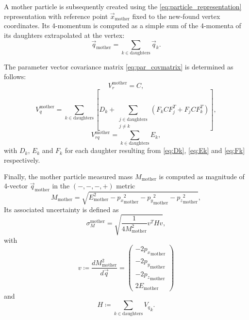 A mother particle is subsequently created using the \eqref{eq:particle_representation} representation with reference point $\vec{x}_\text{mother}$ fixed to the new-found vertex coordinates.
Its 4-momentum is computed as a simple sum of the 4-momenta of its daughters extrapolated at the vertex:
\begin{equation}
	\vec{q}_\text{mother} = \sum_{k \in \text{daughters}} \vec{q}_k.
\end{equation}

The parameter vector covariance matrix \eqref{eq:par_covmatrix} is determined as follows:
\begin{equation}
	V_{r}^\text{mother} = C,
\end{equation}
\begin{equation}
	V_{q}^\text{mother} = \sum_{k \in \text{daughters}} \left[
		D_k
		+
		\sum_{\substack{j\in\text{daughters} \\ j \neq k}}
		\left(
			F_k C F_j^T + F_j C F_k^T
		\right)
	\right],
\end{equation}
\begin{equation}
	V_{rq}^\text{mother} = \sum_{k \in \text{daughters}} E_k,
\end{equation}
with $D_k$, $E_k$ and $F_k$ for each daughter resulting from \eqref{eq:Dk}, \eqref{eq:Ek} and \eqref{eq:Fk} respectively.

Finally, the mother particle measured mass $M_\text{mother}$ is computed as magnitude of 4-vector $\vec{q}_\text{mother}$ in the $(-,-,-,+)$ metric
\begin{equation}
	M_\text{mother} = \sqrt{E_\text{mother}^2
	- {p_x}_\text{mother}^2
	- {p_y}_\text{mother}^2
	- {p_z}_\text{mother}^2
	},
\end{equation}
Its associated uncertainty is defined as
\begin{equation}
	\sigma_M^\text{mother} = \sqrt{
		\frac{1}{4 M_\text{mother}^2}
		v^T
		H
		v
	},
\end{equation}
with
\begin{equation}
	v \coloneqq \frac{dM_\text{mother}^2}{d\vec{q}}
	= \begin{pmatrix}
		-2 {p_x}_\text{mother} \\
		-2 {p_y}_\text{mother} \\
		-2 {p_z}_\text{mother} \\
		2 E_\text{mother}
	\end{pmatrix}
\end{equation}
and
\begin{equation}
	H \coloneqq \sum_{k \in \text{daughters}} {V_q}_k.
\end{equation}

